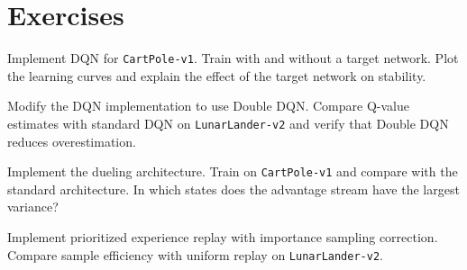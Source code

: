 \section{Exercises}
\label{sec:dqn:exercises}

\begin{exercise}
Implement DQN for \texttt{CartPole-v1}. Train with and without a target
network. Plot the learning curves and explain the effect of the target
network on stability.
\end{exercise}

\begin{exercise}
Modify the DQN implementation to use Double DQN. Compare Q-value
estimates with standard DQN on \texttt{LunarLander-v2} and verify that
Double DQN reduces overestimation.
\end{exercise}

\begin{exercise}
Implement the dueling architecture. Train on \texttt{CartPole-v1} and
compare with the standard architecture. In which states does the
advantage stream have the largest variance?
\end{exercise}

\begin{exercise}
Implement prioritized experience replay with importance sampling
correction. Compare sample efficiency with uniform replay on
\texttt{LunarLander-v2}.
\end{exercise}
